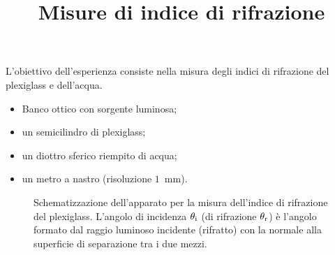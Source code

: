 \documentclass{lab1-article}
\title{Misure di indice di rifrazione}
\begin{document}
\begin{article}

\maketitle

\secsummary

L'obiettivo dell'esperienza consiste nella misura degli indici di rifrazione
del plexiglass e dell'acqua.


\secmaterials

\begin{itemize}
\item Banco ottico con sorgente luminosa;
\item un semicilindro di plexiglass;
\item un diottro sferico riempito di acqua;
\item un metro a nastro (risoluzione $1$~mm).
\end{itemize}


\secmeasurements



\begin{figure}[htb!]
  \caption{Schematizzazione dell'apparato per la misura dell'indice di
    rifrazione del plexiglass.
    L'angolo di incidenza $\theta_{\rm i}$ (di rifrazione $\theta_{\rm r}$)
    \`e l'angolo formato dal raggio luminoso incidente (rifratto) con la
    normale alla superficie di separazione tra i due mezzi.}
  \label{fig:plexiglass}
\end{figure}



\end{article}
\end{document}
